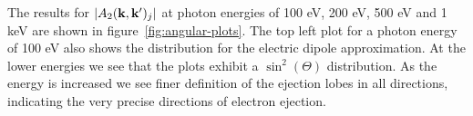 The results for $|A_2(\mathbf{k},\mathbf{k'})_j|$ at photon energies of
100 eV, 200 eV, 500 eV and 1 keV are shown in figure~\ref{fig:angular-plots}.
The top left plot for a photon energy of 100 eV also shows the distribution
for the electric dipole approximation. 
At the lower energies we see that the plots exhibit a $\sin^2(\Theta)$
distribution. As the energy is increased we see finer definition
of the ejection lobes in all directions, indicating the very precise
directions of electron ejection.




